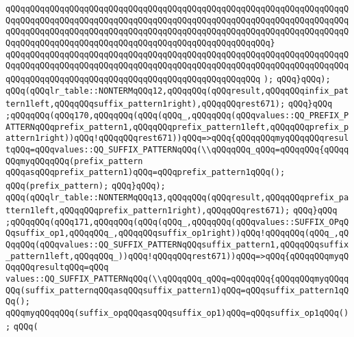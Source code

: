 \verb|qQQqqQQqqQQqqQQqqQQqqQQqqQQqqQQqqQQqqQQqqQQqqQQqqQQqqQQqqQQqqQQqqQQqqQQqqQQqqQQqqQQqqQQqqQQqqQQqqQQqqQQqqQQqqQQqqQQqqQQqqQQqqQQqqQQqqQQqqQQqqQQqqQQqqQQqqQQqqQQqqQQqqQQqqQQqqQQqqQQqqQQqqQQqqQQqqQQqqQQqqQQqqQQqqQQqqQQqqQQqqQQqqQQqqQQqqQQqqQQqqQQqqQQqqQQqqQQqqQQqqQQq}|\newline
\verb|qQQqqQQqqQQqqQQqqQQqqQQqqQQqqQQqqQQqqQQqqQQqqQQqqQQqqQQqqQQqqQQqqQQqqQQqqQQqqQQqqQQqqQQqqQQqqQQqqQQqqQQqqQQqqQQqqQQqqQQqqQQqqQQqqQQqqQQqqQQqqQQqqQQqqQQqqQQqqQQqqQQqqQQqqQQqqQQqqQQqqQQqqQQqqQQq|\newline
\verb|);|\newline
\verb|qQQq}qQQq);|\newline
\verb|qQQq(qQQqlr_table::NONTERMqQQq12,qQQqqQQq(qQQqresult,qQQqqQQqinfix_pattern1left,qQQqqQQqsuffix_pattern1right),qQQqqQQqrest671);|\newline
\verb|qQQq}qQQq|\newline
\verb|;qQQqqQQq(qQQq170,qQQqqQQq(qQQq(qQQq_,qQQqqQQq(qQQqvalues::QQ_PREFIX_PATTERNqQQqprefix_pattern1,qQQqqQQqprefix_pattern1left,qQQqqQQqprefix_pattern1right))qQQq!qQQqqQQqrest671))qQQq=>qQQq{qQQqqQQqmyqQQqqQQqresultqQQq=qQQqvalues::QQ_SUFFIX_PATTERNqQQq(\\qQQqqQQq_qQQq=qQQqqQQq{qQQqqQQqmyqQQqqQQq(prefix_pattern|\newline
\verb|qQQqasqQQqprefix_pattern1)qQQq=qQQqprefix_pattern1qQQq();|\newline
\verb|qQQq(prefix_pattern);|\newline
\verb|qQQq}qQQq);|\newline
\verb|qQQq(qQQqlr_table::NONTERMqQQq13,qQQqqQQq(qQQqresult,qQQqqQQqprefix_pattern1left,qQQqqQQqprefix_pattern1right),qQQqqQQqrest671);|\newline
\verb|qQQq}qQQq|\newline
\verb|;qQQqqQQq(qQQq171,qQQqqQQq(qQQq(qQQq_,qQQqqQQq(qQQqvalues::SUFFIX_OPqQQqsuffix_op1,qQQqqQQq_,qQQqqQQqsuffix_op1right))qQQq!qQQqqQQq(qQQq_,qQQqqQQq(qQQqvalues::QQ_SUFFIX_PATTERNqQQqsuffix_pattern1,qQQqqQQqsuffix_pattern1left,qQQqqQQq_))qQQq!qQQqqQQqrest671))qQQq=>qQQq{qQQqqQQqmyqQQqqQQqresultqQQq=qQQq|\newline
\verb|values::QQ_SUFFIX_PATTERNqQQq(\\qQQqqQQq_qQQq=qQQqqQQq{qQQqqQQqmyqQQqqQQq(suffix_patternqQQqasqQQqsuffix_pattern1)qQQq=qQQqsuffix_pattern1qQQq();|\newline
\verb|qQQqmyqQQqqQQq(suffix_opqQQqasqQQqsuffix_op1)qQQq=qQQqsuffix_op1qQQq();|\newline
\verb|qQQq(|\newline

